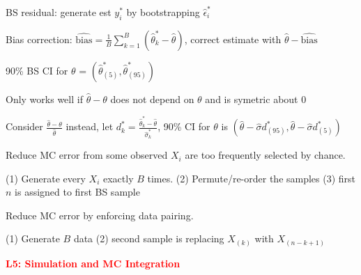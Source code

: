 \documentclass{article}
\renewcommand{\section}[1]{\textcolor{red}{\textbf{#1}}}
\renewcommand{\subsection}[1]{\text{\hl{[#1]}}}
\begin{document}
BS residual: generate est $y_i^*$ by bootstrapping $\hat\epsilon_i^*$

Bias correction: $\hat{\text{bias}} = \frac{1}{B}\sum_{k=1}^B (\hat\theta_k^* - \hat\theta)$, correct estimate with $\hat\theta - \hat{\text{bias}}$

\subsection{BS Percentile CI}

90\% BS CI for $\theta$ = $\left(\hat\theta^*_{(5)}, \hat\theta^*_{(95)}\right)$

Only works well if $\hat\theta - \theta$ does not depend on $\theta$ and is symetric about 0

\subsection{BS t CI}

Consider $\frac{\hat\theta - \theta}{\hat\theta}$ instead, let $d^*_k = \frac{\hat\theta_k^* - \hat\theta}{\hat\sigma^*_k}$,
90\% CI for $\theta$ is $(\hat\theta - \hat\sigma d^*_{(95)}, \hat\theta - \hat\sigma d^*_{(5)})$

\subsection{Balanced BS}

Reduce MC error from some observed $X_i$ are too frequently selected by chance.

(1) Generate every $X_i$ exactly $B$ times. (2) Permute/re-order the samples (3) first $n$ is assigned to first BS sample

\subsection{Antithetic BS}

Reduce MC error by enforcing data pairing.

(1) Generate $B$ data (2) second sample is replacing $X_{(k)}$ with $X_{(n-k+1)}$


\section{L5: Simulation and MC Integration}


\subsection{MC integration}
\end{document}
